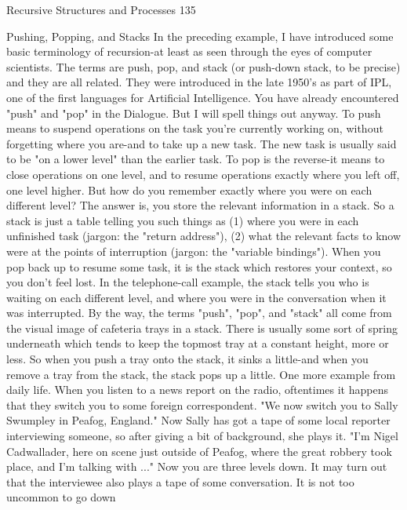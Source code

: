 Recursive Structures and Processes                                                     135

                           Pushing, Popping, and Stacks
In the preceding example, I have introduced some basic terminology of recursion-at least
as seen through the eyes of computer scientists. The terms are push, pop, and stack (or
push-down stack, to be precise) and they are all related. They were introduced in the late
1950's as part of IPL, one of the first languages for Artificial Intelligence. You have
already encountered "push" and "pop" in the Dialogue. But I will spell things out
anyway. To push means to suspend operations on the task you're currently working on,
without forgetting where you are-and to take up a new task. The new task is usually said
to be "on a lower level" than the earlier task. To pop is the reverse-it means to close
operations on one level, and to resume operations exactly where you left off, one level
higher.
         But how do you remember exactly where you were on each different level? The
answer is, you store the relevant information in a stack. So a stack is just a table telling
you such things as (1) where you were in each unfinished task (jargon: the "return
address"), (2) what the relevant facts to know were at the points of interruption (jargon:
the "variable bindings"). When you pop back up to resume some task, it is the stack
which restores your context, so you don't feel lost. In the telephone-call example, the
stack tells you who is waiting on each different level, and where you were in the
conversation when it was interrupted.
         By the way, the terms "push", "pop", and "stack" all come from the visual image
of cafeteria trays in a stack. There is usually some sort of spring underneath which tends
to keep the topmost tray at a constant height, more or less. So when you push a tray onto
the stack, it sinks a little-and when you remove a tray from the stack, the stack pops up a
little.
         One more example from daily life. When you listen to a news report on the radio,
oftentimes it happens that they switch you to some foreign correspondent. "We now
switch you to Sally Swumpley in Peafog, England." Now Sally has got a tape of some
local reporter interviewing someone, so after giving a bit of background, she plays it. "I'm
Nigel Cadwallader, here on scene just outside of Peafog, where the great robbery took
place, and I'm talking with ..." Now you are three levels down. It may turn out that the
interviewee also plays a tape of some conversation. It is not too uncommon to go down
